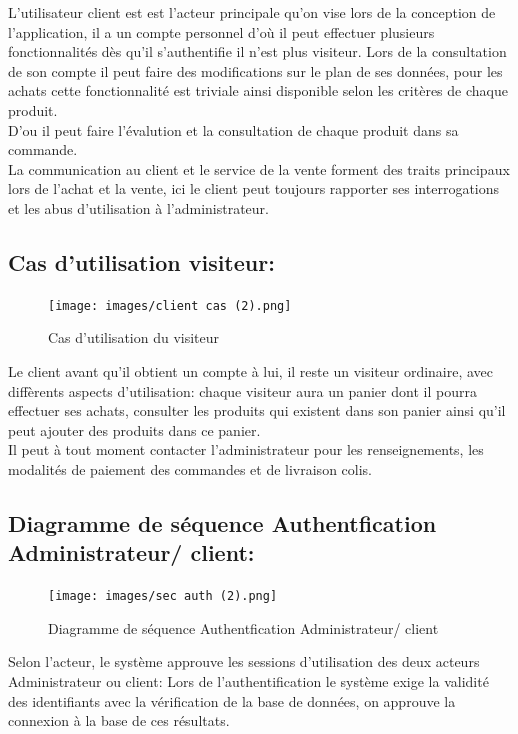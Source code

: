 \documentclass[a4paper,12pt]{report}
\begin{document}
\begin{doublespace}
\begin{doublespace}
\begin{doublespace}
\begin{doublespace}
\begin{doublespace}
L'utilisateur client est est l'acteur principale qu'on vise lors de la conception de l'application, il a un compte personnel d'où il peut effectuer plusieurs fonctionnalités dès qu'il s'authentifie il n'est plus visiteur. Lors de la consultation de son compte il peut faire des modifications sur le plan de ses données, pour les achats cette fonctionnalité est triviale ainsi disponible selon les critères de chaque produit.\\D'ou il peut faire l'évalution et la consultation de chaque produit dans sa commande. \\ La communication au client et le service de la vente forment des traits principaux lors de l'achat et la vente, ici le client peut toujours rapporter ses interrogations et les abus d'utilisation à l'administrateur. 
\newpage
\subsection{Cas d'utilisation visiteur:}
\begin{figure}[H]
\begin{center}
 \texttt{[image: images/client cas (2).png]}
 \caption{Cas d'utilisation du visiteur}
 \end{center}
\end{figure}

Le client avant qu'il obtient un compte à lui, il reste un visiteur ordinaire, avec diffèrents aspects d'utilisation: chaque visiteur aura un panier dont il pourra effectuer ses achats, consulter les produits qui existent dans son panier ainsi qu'il peut ajouter des produits dans ce panier.\\
Il peut à tout moment contacter l'administrateur pour les renseignements, les modalités de paiement des commandes et de livraison colis.

\subsection{Diagramme de séquence Authentfication Administrateur/ client:}
\begin{figure}[H]
\begin{center}
 \texttt{[image: images/sec auth (2).png]}
 \caption{Diagramme de séquence Authentfication Administrateur/ client}
 \end{center}
\end{figure}
Selon l'acteur, le système approuve les sessions d'utilisation des deux acteurs Administrateur ou client: Lors de l'authentification le système exige la validité des identifiants avec la vérification de la base de données, on approuve la connexion à la base de ces résultats.

\end{doublespace}
\end{doublespace}
\end{doublespace}
\end{doublespace}
\end{doublespace}
\end{document}
